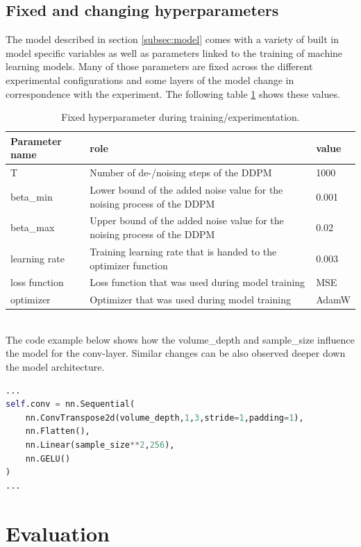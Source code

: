 \documentclass[runningheads]{llncs}
\begin{document}
\subsection*{Fixed and changing hyperparameters}
The model described in section \ref{subsec:model} comes with a variety of built in model specific variables as well as parameters linked to the training of machine learning models. Many of those parameters are fixed across the different experimental configurations and some layers of the model change in correspondence with the experiment. The following table \ref{table:params} shows these values.
\begin{table}[!h]
    \centering
     \caption{Fixed hyperparameter during training/experimentation.}
    \begin{tabular}{|m{5em}||m{20em}|m{5em}|}
        \hline
            Parameter name & role & value\\
        \hline
             T& Number of de-/noising steps of the DDPM & 1000\\
             \hline
             beta\_min & Lower bound of the added noise value for the noising process of the DDPM & 0.001\\
             \hline
             beta\_max & Upper bound of the added noise value for the noising process of the DDPM & 0.02\\
             \hline
             learning rate & Training learning rate that is handed to the optimizer function & 0.003\\
             \hline
             loss function & Loss function that was used during model training & MSE\\
             \hline
             optimizer & Optimizer that was used during model training & AdamW \\
             \hline
    \end{tabular}
    \label{table:params}
\end{table}
\\ \noindent
The code example below shows how the volume\_depth and sample\_size influence the model for the conv-layer. Similar changes can be also observed deeper down the model architecture.
\begin{lstlisting}[language=Python]
...
self.conv = nn.Sequential(
    nn.ConvTranspose2d(volume_depth,1,3,stride=1,padding=1),
    nn.Flatten(),
    nn.Linear(sample_size**2,256),
    nn.GELU()
)
...
\end{lstlisting}
\textcolor{red}{}
\section*{Evaluation}
\end{document}
